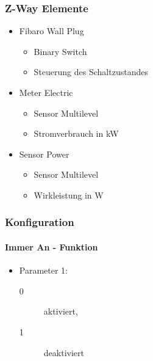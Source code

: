 \subsubsection{Z-Way Elemente}
\begin{itemize}
	\item Fibaro Wall Plug
	\begin{itemize}
		\item Binary Switch
		\item Steuerung des Schaltzustandes
	\end{itemize}
	\item Meter Electric
	\begin{itemize}
		\item Sensor Multilevel
		\item Stromverbrauch in kW
	\end{itemize}
	\item Sensor Power
	\begin{itemize}
		\item Sensor Multilevel
		\item Wirkleistung in W
	\end{itemize}
\end{itemize}

\subsubsection{Konfiguration}

\paragraph{Immer An - Funktion}
\begin{itemize}
	\item Parameter 1:
	\begin{description}
		\item [0] aktiviert,
		\item [1] deaktiviert
	\end{description}
\end{itemize}

